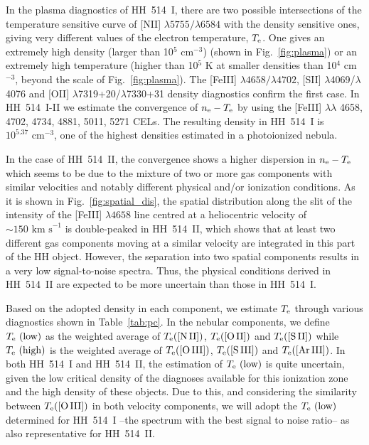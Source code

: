 \documentclass[fleqn,usenatbib]{mnras}
\begin{document}
In the plasma diagnostics of HH~514~I, there are two possible intersections of the temperature sensitive curve of [N\thinspace II] $\lambda5755/\lambda6584$ with the density sensitive ones, giving very different values of the electron temperature,  $T_{\rm e}$. One gives an extremely high density (larger than 10$^5$ cm$^{-3}$) (shown in Fig.~\ref{fig:plasma}) or an extremely high temperature (higher than 10$^{5}$ K at smaller densities than 10$^{4}$ cm$^{-3}$, beyond the scale of Fig.~\ref{fig:plasma}). The [Fe\thinspace III] $\lambda4658/\lambda4702$, [S\thinspace II] $\lambda$4069/$\lambda$4076 and [O\thinspace II] $\lambda$7319+20/$\lambda$7330+31 density diagnostics confirm the first case. In HH~514~I-II we estimate the convergence of $n_{\rm e}-T_{\rm e}$ by using the [Fe\thinspace III] $\lambda \lambda$ 4658, 4702, 4734, 4881, 5011, 5271 CELs. The resulting density in  HH~514~I is $10^{5.37} \text{ cm}^{-3}$, one of the highest densities estimated in a photoionized nebula. 

In the case of HH~514~II, the convergence shows a higher dispersion in $n_{\rm e}-T_{\rm e}$ which seems to be due to the mixture of two or more gas components with similar velocities and notably different physical and/or ionization conditions. As it is shown in Fig.~\ref{fig:spatial_dis}, the spatial distribution along the slit of the intensity of the  [Fe\thinspace III] $\lambda 4658$ line centred at a heliocentric velocity of $\sim 150 \text{ km s}^{-1}$ is double-peaked in HH~514~II, which shows that at least two different gas components moving at a similar velocity are integrated in this part of the HH object. However, the separation into two spatial components results in a very low signal-to-noise spectra. Thus, the physical conditions derived in HH~514~II are expected to be more uncertain than those in HH~514~I.

Based on the adopted density in each component, we estimate $T_{\rm e}$ through various diagnostics shown in Table~\ref{tab:pc}. In the nebular components, we define $T_{\rm e} \text{ (low)}$ as the weighted average of $T_{\rm e} (\text{[N\thinspace II]})$, $T_{\rm e} (\text{[O\thinspace II]})$ and $T_{\rm e} (\text{[S\thinspace II]})$ while $T_{\rm e} \text{ (high)}$ is the weighted average of $T_{\rm e} (\text{[O\thinspace III]})$, $T_{\rm e} (\text{[S\thinspace III]})$ and $T_{\rm e} (\text{[Ar\thinspace III]})$. In both HH~514~I and HH~514~II, the estimation of $T_{\rm e} \text{ (low)}$ is quite uncertain, given the low critical density of the diagnoses available for this ionization zone and the high density of these objects. Due to this, and considering the similarity between $T_{\rm e}(\text{[O\thinspace III]})$ in both velocity components, we will adopt the $T_{\rm e} \text{ (low)}$ determined for  HH~514~I --the spectrum with the best signal to noise ratio-- as also representative for  HH~514~II.
\end{document}
